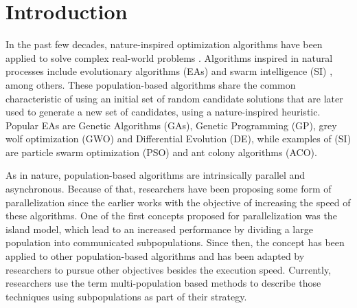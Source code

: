 \documentclass[runningheads]{llncs}
\begin{document}
\section{Introduction}

In the past few decades, nature-inspired optimization algorithms have been
applied to solve complex real-world problems \cite{yang2014nature}. Algorithms
inspired in natural processes include evolutionary algorithms (EAs)
\cite{back1996evolutionary} and swarm intelligence (SI) \cite{kennedy2006swarm},
among others. These population-based algorithms share the common characteristic
of using an initial set of random candidate solutions that are later used to
generate a new set of candidates, using a nature-inspired heuristic. Popular EAs
are Genetic Algorithms (GAs), Genetic Programming (GP), grey wolf optimization
(GWO) and Differential Evolution (DE), while examples of (SI) are particle swarm
optimization (PSO) and ant colony algorithms (ACO).


As in nature, population-based algorithms
are intrinsically parallel and asynchronous. Because of that, researchers have
been proposing some form of parallelization since the earlier works
\cite{muhlenbein1988evolution} with the objective of increasing the speed of
these algorithms. 
One of the first concepts proposed for parallelization was the island model,
which lead to an increased performance \cite{gorges1990explicit,grosso1985computer} 
by dividing a large population into communicated subpopulations.
Since then, the concept has been applied to other population-based algorithms
and has been adapted by researchers to pursue other objectives besides the
execution speed. Currently, researchers use the term multi-population based
methods to describe those techniques using subpopulations as part of their
strategy.
\end{document}
